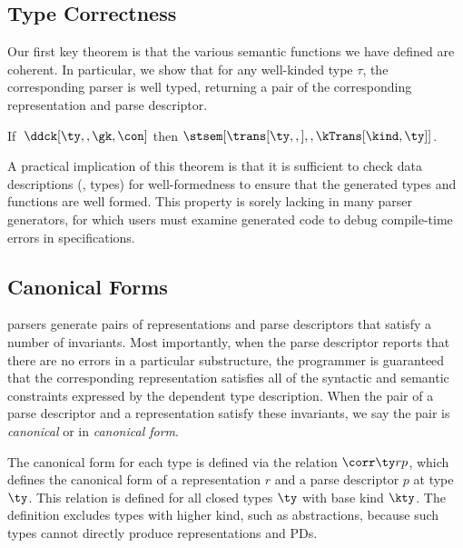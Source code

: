 \subsection{Type Correctness}
Our first key theorem is that the various semantic
functions we have defined are coherent.  In particular, we show that
for any well-kinded \ddca{} type $\tau$, the corresponding parser is
well typed, returning a pair of the corresponding representation and
parse descriptor.


\begin{theorem}
\label{thm:s-type-correctness}
  If $\;\ddck[\ty,,\gk,\con]$ then
  $\stsem[{\trans[\ty,,]},,\kTrans[\kind,\ty]]$.
\end{theorem}

A practical implication of this theorem is that it is sufficient to
check data descriptions (\ie{}, \ddca{} types) for well-formedness to
ensure that the generated types and functions are well formed. This
property is sorely lacking in many parser generators, for which users
must examine generated code to debug compile-time errors in
specifications. 

\subsection{Canonical Forms}

\ddc{} parsers generate pairs of representations and parse descriptors
that satisfy a number of invariants.  Most importantly, 
when the parse descriptor reports that there are no errors in a
particular substructure, the programmer is guaranteed that the corresponding
representation satisfies all of the syntactic and semantic
constraints expressed by the dependent \ddc{} type description.  When
the pair of a parse descriptor and a representation satisfy these invariants, we say
the pair is {\em canonical} or in {\em canonical form}.

The canonical form for each \ddc{} type is defined via the relation $\corr \ty r p$, which
defines the canonical form of a representation $r$ and a parse
descriptor $p$ at type $\ty$.  This relation is defined for all closed types $\ty$ with base kind $\kty$.  The definition excludes
types with higher kind, such as abstractions, because such types
cannot directly produce representations and PDs.
\cut{
}

